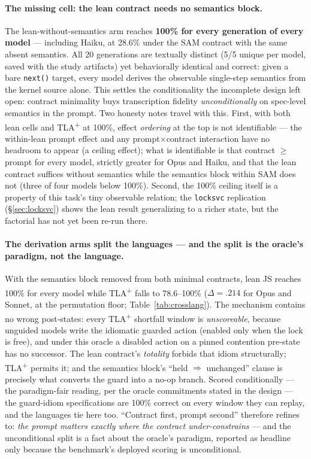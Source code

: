 \documentclass[11pt]{article}
\newcommand{\tlaplus}{TLA\texorpdfstring{\textsuperscript{+}}{+}}
\begin{document}
\paragraph{The missing cell: the lean contract needs no semantics block.}
The lean-without-semantics arm reaches \textbf{100\% for every generation of
every model} --- including Haiku, at 28.6\% under the SAM contract with the
same absent semantics. All 20 generations are textually distinct (5/5 unique
per model, saved with the study artifacts) yet behaviorally identical and
correct: given a bare \texttt{next()} target, every model derives the
observable single-step semantics from the kernel source alone. This settles
the conditionality the incomplete design left open: contract minimality buys
transcription fidelity \emph{unconditionally} on spec-level semantics in the
prompt. Two honesty notes travel with this. First, with both lean cells and
\tlaplus{} at 100\%, effect \emph{ordering} at the top is not identifiable
--- the within-lean prompt effect and any prompt$\times$contract interaction
have no headroom to appear (a ceiling effect); what is identifiable is that
contract $\geq$ prompt for every model, strictly greater for Opus and Haiku,
and that the lean contract suffices without semantics while the semantics
block within SAM does not (three of four models below 100\%). Second, the
100\% ceiling itself is a property of this task's tiny observable relation;
the \texttt{locksvc} replication (\S\ref{sec:locksvc}) shows the lean result
generalizing to a richer state, but the factorial has not yet been re-run
there.

\paragraph{The derivation arms split the languages --- and the split is the
oracle's paradigm, not the language.}
With the semantics block removed from both minimal contracts, lean JS
reaches 100\% for every model while \tlaplus{} falls to 78.6--100\%
($\Delta{=}.214$ for Opus and Sonnet, at the permutation floor;
Table~\ref{tab:crosslang}). The mechanism contains no wrong post-states:
every \tlaplus{} shortfall window is \emph{unscoreable}, because unguided
models write the idiomatic guarded action (enabled only when the lock is
free), and under this oracle a disabled action on a pinned contention
pre-state has no successor. The lean contract's \emph{totality} forbids
that idiom structurally; \tlaplus{} permits it; and the semantics block's
``held $\Rightarrow$ unchanged'' clause is precisely what converts the
guard into a no-op branch. Scored conditionally --- the paradigm-fair
reading, per the oracle commitments stated in the design --- the
guard-idiom specifications are 100\% correct on every window they can
replay, and the languages tie here too. ``Contract first, prompt second''
therefore refines to: \emph{the prompt matters exactly where the contract
under-constrains} --- and the unconditional split is a fact about the
oracle's paradigm, reported as headline only because the benchmark's
deployed scoring is unconditional.
\end{document}
